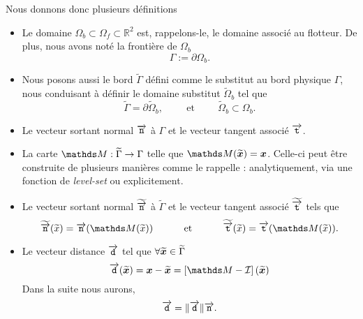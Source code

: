 Nous donnons donc plusieurs définitions
\begin{itemize}[label=$\mybullet$]
	\item Le domaine $\Omega_b\subset \Omega_f \subset \mathbb{R}^2$ est, rappelons-le, le domaine associé au flotteur. De plus, nous avons noté la frontière de $\Omega_b$
	\begin{equation}
		\Gamma := \partial\Omega_b.
	\end{equation}  
	\item Nous posons aussi le bord $\widetilde{\Gamma}$ défini comme le substitut au bord physique $\Gamma$, nous conduisant à définir le domaine substitut $\widetilde{\Omega}_b$ tel que
	\begin{equation}
		\widetilde{\Gamma} = \partial \widetilde{\Omega}_b, \hspace{1cm}\text{et}\hspace{1cm} \widetilde{\Omega}_b \subset \Omega_b.
	\end{equation}
	\item Le vecteur sortant normal $\overrightarrow{\boldsymbol{\mathtt{n}}}$ à $\Gamma$ et le vecteur tangent associé $\overrightarrow{\boldsymbol{\mathtt{t}}}$.
	\item La carte $\mapgamma : \widetilde{\Gamma}\to\Gamma$ telle que $\mapgamma(\bld{\widetilde{x}}) = \bld{x}$. Celle-ci peut être construite de plusieurs manières comme le rappelle \citet{main_shifted_2018} : analytiquement, via une fonction de \textit{level-set} ou explicitement.
	\item Le vecteur sortant normal $\widetilde{\overrightarrow{\boldsymbol{\mathtt{n}}}}$ à $\widetilde{\Gamma}$ et le vecteur tangent associé $\widetilde{\overrightarrow{\boldsymbol{\mathtt{t}}}}$ tels que
	\begin{equation}
		\widetilde{\outngamma}(\widetilde{x}) = \outngamma(\mapgamma (\widetilde{x})) \hspace{1cm}\text{ et }\hspace{1cm}\widetilde{\outtgamma}(\widetilde{x}) = \outtgamma(\mapgamma (\widetilde{x})).
	\end{equation}
	\item Le vecteur distance $\overrightarrow{\boldsymbol{\mathtt{d}}}$ tel que $\forall \boldsymbol{\widetilde{x}}\in\widetilde{\Gamma}$
	\begin{equation}
		\dgamma (\bld{\widetilde{x}}) = \bld{x} - \bld{\widetilde{x}} = \left[\mapgamma - \id\right]\left(\bld{\widetilde{x}}\right) 
	\end{equation}
	Dans la suite nous aurons, 
	\begin{equation}
		\overrightarrow{\boldsymbol{\mathtt{d}}} = \|\overrightarrow{\boldsymbol{\mathtt{d}}}\|\overrightarrow{\boldsymbol{\mathtt{n}}}.
	\end{equation}
\end{itemize}

